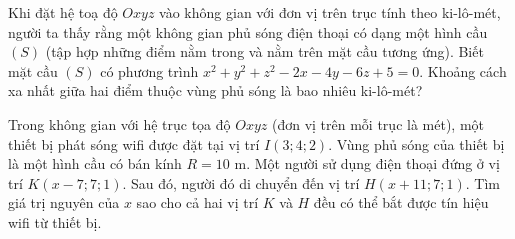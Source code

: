 \begin{bt}%
	Khi đặt hệ toạ độ $Oxyz$ vào không gian với đơn vị trên trục tính theo ki-lô-mét, người ta thấy rằng một không gian  phủ sóng điện thoại có dạng một hình cầu $(S)$ (tập hợp những điểm nằm trong và nằm trên mặt cầu tương ứng). Biết mặt cầu $(S)$ có phương trình $x^2+y^2+z^2-2x-4y-6z+5=0$. Khoảng cách xa nhất giữa hai điểm thuộc vùng phủ sóng là bao nhiêu ki-lô-mét?
\end{bt}

\begin{bt}%
	Trong không gian với hệ trục tọa độ $Oxyz$ (đơn vị trên mỗi trục là mét), một thiết bị phát sóng wifi được đặt tại vị trí $I(3;4;2)$. Vùng phủ sóng của thiết bị là một hình cầu có bán kính $R= 10$ m. Một người sử dụng điện thoại đứng ở vị trí $K(x-7;7;1)$. Sau đó, người đó  di chuyển đến vị trí $H(x+11;7;1)$. Tìm giá trị nguyên của $x$ sao cho cả hai vị trí $K$ và $H$ đều có thể bắt được tín hiệu wifi từ thiết bị.
\end{bt}

